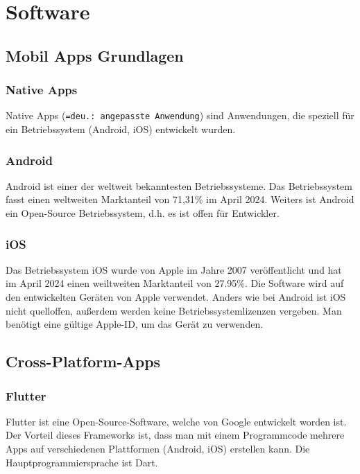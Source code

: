 \section{Software}


\subsection{Mobil Apps Grundlagen}

\subsubsection{Native Apps}

Native Apps (\texttt{=deu.: angepasste Anwendung}) sind Anwendungen, die speziell für ein Betriebssystem (Android, iOS) entwickelt wurden.

\subsubsection{Android}

Android ist einer der weltweit bekanntesten Betriebssysteme. Das Betriebssystem fasst einen weltweiten Marktanteil von 71,31\% im April 2024. \parencite{AndroidVsiOS} Weiters ist Android ein Open-Source Betriebssystem, d.h. es ist offen für Entwickler.  

\subsubsection{iOS}

Das Betriebssystem iOS wurde von Apple im Jahre 2007 veröffentlicht und hat im April 2024 einen weiltweiten Marktanteil von 27.95\%. \parencite{AndroidVsiOS} Die Software wird auf den entwickelten Geräten von Apple verwendet. Anders wie bei Android ist iOS nicht quelloffen, außerdem werden keine Betriebssystemlizenzen vergeben. Man benötigt eine gültige Apple-ID, um das Gerät zu verwenden.

\subsection{Cross-Platform-Apps}

\subsubsection{Flutter}

Flutter ist eine Open-Source-Software, welche von Google entwickelt worden ist.\parencite{Flutter} Der Vorteil dieses Frameworks ist, dass man mit einem Programmcode mehrere Apps auf verschiedenen Plattformen (Android, iOS) erstellen kann. Die Hauptprogrammiersprache ist Dart.

